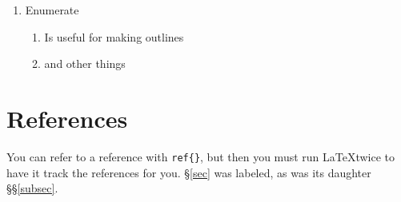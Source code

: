 \documentclass[12pt, letterpaper]{article}
\begin{document}
	\begin{enumerate}
		\item Enumerate
		\begin{enumerate}
			\item Is useful for making outlines
			\item and other things
		\end{enumerate}
	\end{enumerate}
	
	\section*{References}
	
		You can refer to a reference with \texttt{ref\{\}}, but then you must run \LaTeX twice to have it track the references for you. \S{\ref{sec}} was labeled, as was its daughter \S\S\ref{subsec}.
\end{document}
